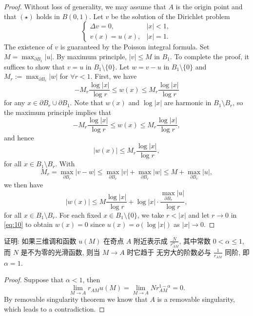 \begin{proof}
	Without loss of generality, we may assume that $A$ is the origin point
	and that $(\star)$ holds in $B(0,1)$.
	Let $v$ be the solution of the Dirichlet problem
	\[\begin{cases}
		\Delta v = 0, & |x|<1, \\
		v(x) = u(x), &  |x|=1.
	\end{cases}\]
	The existence of $v$ is guaranteed by the Poisson integral formula.
	Set $M = \max_{\partial B_1} |u|$. By maximum principle, $|v|\leq M$ in $B_1$.
	To complete the proof, it suffices to show that $v = u$ in $B_1\setminus \{0\}$.
	Let $w = v-u$ in $B_1\setminus \{0\}$ and $M_r:=\max_{\partial B_r} |w|$ for
	$\forall r<1$. First, we have
	\begin{equation}\label{eq:7}
		- M_r \frac{\log |x|}{\log r} \leq w(x) \leq M_r \frac{\log |x|}{\log r}
	\end{equation}
	for any $x\in \partial B_r\cup\partial B_1$.
	Note that $w(x)$ and $\log |x|$ are harmonic in $B_1\setminus B_r$,
	so the maximum principle implies that
	\[ - M_r \frac{\log |x|}{\log r} \leq w(x) \leq M_r \frac{\log |x|}{\log r}, \]
	and hence
	\begin{equation}\label{eq:8}
		|w(x)| \leq M_r \frac{\log |x|}{\log r},
	\end{equation}
	for all $x\in B_1\setminus B_r$. With
	\begin{equation}\label{eq:9}
		M_r = \max_{\partial B_r} |v-w| \leq \max_{\partial B_r} |v|
		+ \max_{\partial B_r} |w|
		\leq M + \max_{\partial B_r} |u|,
	\end{equation}
	we then have
	\begin{equation}\label{eq:10}
		|w(x)| \leq M \frac{\log |x|}{\log r}
		+ \log |x| \cdot \frac{\max_{\partial B_r} |u|}{\log r},
	\end{equation}
	for all $x\in B_1\setminus B_r$. For each fixed $x\in B_1\setminus \{0\}$,
	we take $r<|x|$ and let $r\to 0$ in \eqref{eq:10}
	to obtain $w(x) = 0$ since $u(x) = o(\log |x|)$ as $|x|\to 0$.
\end{proof}


\begin{exercise}[3]
	证明: 如果三维调和函数 $u(M)$ 在奇点 $A$ 附近表示成 $\frac{N}{r_{AM}^{\alpha}}$,
	其中常数 $0<\alpha\leq 1$, 而 $N$ 是不为零的光滑函数, 则当 $M\to A$ 时它趋于
	无穷大的阶数必与 $\frac{1}{r_{AM}}$ 同阶, 即 $\alpha=1$.
\end{exercise}

\begin{proof}
	Suppose that $\alpha<1$, then
	\[\lim_{M\to A}r_{AM}u(M) = \lim_{M\to A}Nr_{AM}^{1-\alpha} = 0.\]
	By removable singularity theorem we know that $A$ is a removable singularity,
	which leads to a contradiction.
\end{proof}


